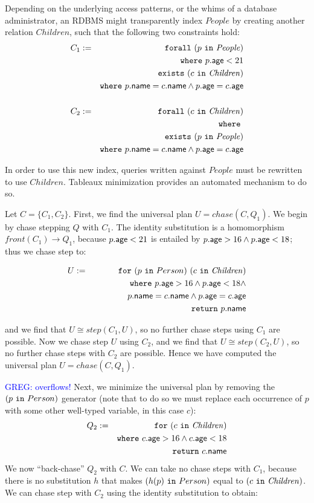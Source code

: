 \documentclass[preprint]{sigplanconf}
\newcommand{\FOR}{{\tt for} \ }
\newcommand{\FORALL}{{\tt forall} \ }
\newcommand{\EXISTS}{{\tt exists} \ }
\newcommand{\WHERE}{{\tt where} \ }
\newcommand{\IN}{ \ {\tt in} \ }
\newcommand{\RETURN}{{\tt return} \ }
\newcommand{\greg}[1]{\textcolor{blue}{GREG: #1}}
\newcommand{\relation}[1]{\ensuremath{\mathit{#1}}\xspace}
\begin{document}
Depending on the underlying access patterns, or the whims of a database administrator, an RDBMS might transparently index \relation{People} by creating another relation \relation{Children}, such that the following two constraints hold:
\begin{eqnarray*}
C_1 & := & \FORALL (p \IN \relation{People}) \\
 & & \WHERE p.{\sf age} < 21 \\
 & & \EXISTS (c \IN \relation{Children}) \\
 & & \WHERE p.{\sf name} = c.{\sf name} \wedge p.{\sf age} = c.{\sf age}  \\
 & & \\
  C_2 & := & \FORALL (c \IN \relation{Children}) \\
  & & \WHERE \\
 & & \EXISTS (p \IN \relation{People}) \\
 & & \WHERE p.{\sf name} = c.{\sf name} \wedge p.{\sf age} = c.{\sf age}
\end{eqnarray*}

In order to use this new index, queries written against \relation{People} must be rewritten to use \relation{Children}.
Tableaux minimization provides an automated mechanism to do so.

Let $C = \{ C_1, C_2\}$.  First, we find the universal plan $U = chase(C, Q_1)$.  We begin by chase stepping $Q$ with $C_1$.  The identity substitution is a homomorphism $front(C_1) \to Q_1$, because $p.{\sf age} < 21$ is entailed by $p.{\sf age} > 16 \wedge p.{\sf age} < 18$; thus we chase step to:
\begin{normalsize}
\begin{eqnarray*}
U & := & \FOR (p \IN Person) \ (c \IN \relation{Children}) \\
 & & \WHERE p.{\sf age} > 16 \wedge p.{\sf age} < 18 \wedge \\
 & & \ \ \ \ \ \ \ \ \ \ \ \ p.{\sf name} = c.{\sf name} \wedge p.{\sf age} = c.{\sf age} \\
 & & \RETURN p.{\sf name}
\end{eqnarray*}  
\end{normalsize}
and we find that $U \cong step(C_1, U)$, so no further chase steps using $C_1$ are possible.  Now we chase step $U$ using $C_2$, and we find that $U \cong step(C_2, U)$, so no further chase steps with $C_2$ are possible.  Hence we have computed the universal plan $U = chase(C,Q_1)$.

\greg{overflows!}
Next, we minimize the universal plan by removing the $(p \IN Person)$ generator (note that to do so we must replace each occurrence of $p$ with some other well-typed variable, in this case $c$):
\begin{eqnarray*}
Q_2 & := & \FOR (c \IN \relation{Children}) \\
 & & \WHERE c.{\sf age} > 16 \wedge c.{\sf age} < 18 \\
  & & \RETURN c.{\sf name}
\end{eqnarray*}  
We now ``back-chase'' $Q_2$ with $C$.  We can take no chase steps with $C_1$, because there is no substitution $h$ that makes $(h(p) \IN Person)$ equal to $(c \IN \relation{Children})$.  We can chase step with $C_2$ using the identity substitution to obtain:
\end{document}
